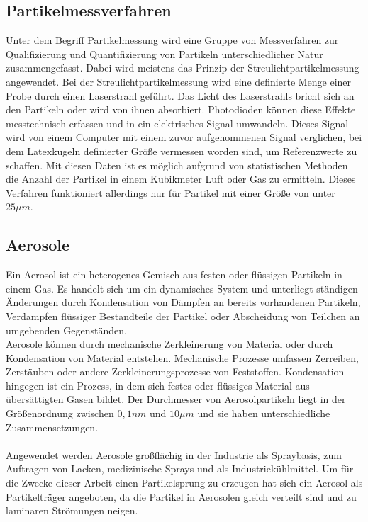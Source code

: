\subsection{Partikelmessverfahren}
Unter dem Begriff Partikelmessung wird eine Gruppe von Messverfahren zur Qualifizierung und Quantifizierung von Partikeln unterschiedlicher Natur zusammengefasst. Dabei wird meistens das Prinzip der Streulichtpartikelmessung angewendet. Bei der Streulichtpartikelmessung wird eine definierte Menge einer Probe durch einen Laserstrahl gef\"{u}hrt. Das Licht des Laserstrahls bricht sich an den Partikeln oder wird von ihnen absorbiert. Photodioden k\"{o}nnen diese Effekte messtechnisch erfassen und in ein elektrisches Signal umwandeln. Dieses Signal wird von einem Computer mit einem zuvor aufgenommenen Signal verglichen, bei dem Latexkugeln definierter Gr\"{o}{\ss}e vermessen worden sind, um Referenzwerte zu schaffen. Mit diesen Daten ist es m\"{o}glich aufgrund von statistischen Methoden die Anzahl der Partikel in einem Kubikmeter Luft oder Gas zu ermitteln. Dieses Verfahren funktioniert allerdings nur f\"{u}r Partikel mit einer Gr\"{o}{\ss}e von unter \(25 \mu m\)\cite{reinraumtechnik}.

\subsection{Aerosole}
Ein Aerosol ist ein heterogenes Gemisch aus festen oder fl\"{u}ssigen Partikeln in einem Gas. Es handelt sich um ein dynamisches System und unterliegt st\"{a}ndigen \"{A}nderungen durch Kondensation von D\"{a}mpfen an bereits vorhandenen Partikeln, Verdampfen fl\"{u}ssiger Bestandteile der Partikel oder Abscheidung von Teilchen an umgebenden Gegenst\"{a}nden.\\
Aerosole k\"{o}nnen durch mechanische Zerkleinerung von Material oder durch Kondensation von Material entstehen. Mechanische Prozesse umfassen Zerreiben, Zerst\"{a}uben oder andere Zerkleinerungsprozesse von Feststoffen. Kondensation hingegen ist ein Prozess, in dem sich festes oder fl\"{u}ssiges Material aus \"{u}bers\"{a}ttigten Gasen bildet. Der Durchmesser von Aerosolpartikeln liegt in der Gr\"{o}{\ss}enordnung zwischen \(0,1 nm\) und \(10 \mu m\) und sie haben unterschiedliche Zusammensetzungen.
\\\\
Angewendet werden Aerosole gro{\ss}fl\"{a}chig in der Industrie als Spraybasis, zum Auftragen von Lacken, medizinische Sprays und als Industriek\"{u}hlmittel. Um f\"{u}r die Zwecke dieser Arbeit einen Partikelsprung zu erzeugen hat sich ein Aerosol als Partikeltr\"{a}ger angeboten, da die Partikel in Aerosolen gleich verteilt sind und zu laminaren Str\"{o}mungen neigen\cite{aerosole}.